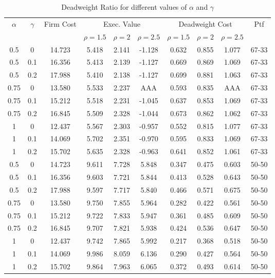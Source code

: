 \vspace*{10pt}

\begin{table}[H]
    \centering
    \begin{tabular}{cccccccccc}
        \hline
        \multirow{2}{*}{$\alpha$} & \multirow{2}{*}{$\gamma$} & \multirow{2}{*}{Firm Cost} & \multicolumn{3}{c}{Exec. Value} & \multicolumn{3}{c}{Deadweight Cost} & \multirow{2}{*}{Ptf}\\
        & & & $\rho = 1.5$ & $\rho = 2$ & $\rho = 2.5$ & $\rho = 1.5$ & $\rho = 2$ & $\rho = 2.5$ & \\
        \hline
        0.5 & 0 & 14.723 & 5.418 & 2.141 & -1.128 & 0.632 & 0.855 & 1.077 & 67-33 \\
        0.5 & 0.1 & 16.356 & 5.413 & 2.139 & -1.127 & 0.669 & 0.869 & 1.069 & 67-33 \\
        0.5 & 0.2 & 17.988 & 5.410 & 2.138 & -1.127 & 0.699 & 0.881 & 1.063 & 67-33 \\
        0.75 & 0 & 13.580 & 5.533 & 2.237 & AAA & 0.593 & 0.835 & AAA & 67-33 \\
        0.75 & 0.1 & 15.212 & 5.518 & 2.231 & -1.045 & 0.637 & 0.853 & 1.069 & 67-33 \\
        0.75 & 0.2 & 16.845 & 5.509 & 2.328 & -1.044 & 0.673 & 0.862 & 1.062 & 67-33 \\
        1 & 0 & 12.437 & 5.567 & 2.303 & -0.957 & 0.552 & 0.815 & 1.077 & 67-33 \\
        1 & 0.1 & 14.069 & 5.702 & 2.351 & -0.970 & 0.595 & 0.833 & 1.069 & 67-33 \\
        1 & 0.2 & 15.702 & 5.635 & 2.328 & -0.963 & 0.641 & 0.852 & 1.061 & 67-33 \\
        0.5 & 0 & 14.723 & 9.611 & 7.728 & 5.848 & 0.347 & 0.475 & 0.603 & 50-50 \\
        0.5 & 0.1 & 16.356 & 9.603 & 7.721 & 5.844 & 0.413 & 0.528 & 0.643 & 50-50 \\
        0.5 & 0.2 & 17.988 & 9.597 & 7.717 & 5.840 & 0.466 & 0.571 & 0.675 & 50-50 \\
        0.75 & 0 & 13.580 & 9.750 & 7.855 & 5.964 & 0.282 & 0.422 & 0.561 & 50-50 \\
        0.75 & 0.1 & 15.212 & 9.722 & 7.833 & 5.947 & 0.361 & 0.485 & 0.609 & 50-50 \\
        0.75 & 0.2 & 16.845 & 9.707 & 7.821 & 5.938 & 0.424 & 0.536 & 0.647 & 50-50 \\
        1 & 0 & 12.437 & 9.742 & 7.865 & 5.992 & 0.217 & 0.368 & 0.518 & 50-50 \\
        1 & 0.1 & 14.069 & 9.986 & 8.059 & 6.136 & 0.290 & 0.427 & 0.564 & 50-50 \\
        1 & 0.2 & 15.702 & 9.864 & 7.963 & 6.065 & 0.372 & 0.493 & 0.614 & 50-50 \\
        \hline
    
    \end{tabular}

    \caption{Deadweight Ratio for different values of $\alpha$ and $\gamma$}
    \label{tab:deadweight_ratio}
\end{table}

\vspace*{10pt}
    